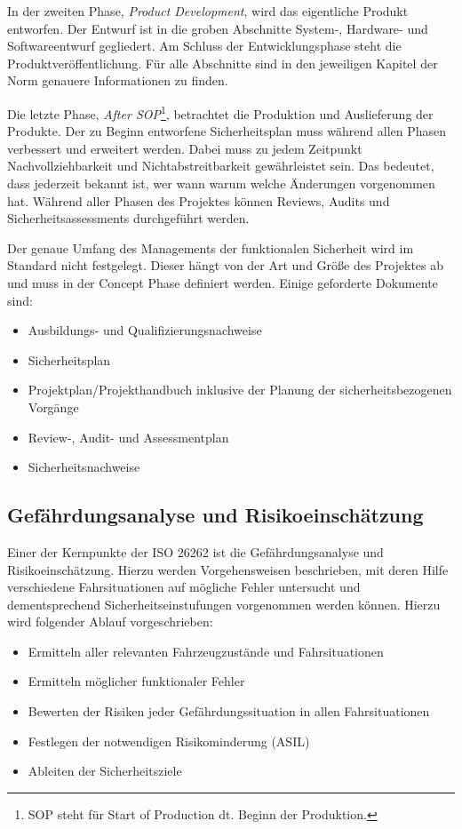 \documentclass[
  a4paper,					    %
  twoside,
  DIV=calc,     				%
  bibliography=totoc,
  cleardoublepage=empty,
  ngerman,     					%
  final       					%
]{scrbook}
\begin{document}
In der zweiten Phase, \emph{Product Development}, wird das eigentliche Produkt entworfen. Der Entwurf ist in die groben Abschnitte System-, Hardware- und Softwareentwurf gegliedert. Am Schluss der Entwicklungsphase steht die Produktveröffentlichung. Für alle Abschnitte sind in den jeweiligen Kapitel der Norm genauere Informationen zu finden.

Die letzte Phase, \emph{After SOP}\footnote{SOP steht für Start of Production dt. Beginn der Produktion.}, betrachtet die Produktion und Auslieferung der Produkte. Der zu Beginn entworfene Sicherheitsplan muss während allen Phasen verbessert und erweitert werden. Dabei muss zu jedem Zeitpunkt Nachvollziehbarkeit und Nichtabstreitbarkeit gewährleistet sein. Das bedeutet, dass jederzeit bekannt ist, wer wann warum welche Änderungen vorgenommen hat. Während aller Phasen des Projektes können Reviews, Audits und Sicherheitsassessments durchgeführt werden.

Der genaue Umfang des Managements der funktionalen Sicherheit wird im Standard nicht festgelegt. Dieser hängt von der Art und Größe des Projektes ab und muss in der Concept Phase definiert werden. Einige geforderte Dokumente sind:

\begin{itemize}
    \item Ausbildungs- und Qualifizierungsnachweise
    \item Sicherheitsplan
    \item Projektplan/Projekthandbuch inklusive der Planung der sicherheitsbezogenen Vorgänge
    \item Review-, Audit- und Assessmentplan
    \item Sicherheitsnachweise
\end{itemize}

\subsection{Gefährdungsanalyse und Risikoeinschätzung}
\label{sec:ISO26262_GundR}
Einer der Kernpunkte der ISO 26262 ist die Gefährdungsanalyse und Risikoeinschätzung. Hierzu werden Vorgehensweisen beschrieben, mit deren Hilfe verschiedene Fahrsituationen auf mögliche Fehler untersucht und dementsprechend Sicherheitseinstufungen vorgenommen werden können. Hierzu wird folgender Ablauf vorgeschrieben:

\begin{itemize}
    \item Ermitteln aller relevanten Fahrzeugzustände und Fahrsituationen
    \item Ermitteln möglicher funktionaler Fehler
    \item Bewerten der Risiken jeder Gefährdungssituation in allen Fahrsituationen
    \item Festlegen der notwendigen Risikominderung (ASIL)
    \item Ableiten der Sicherheitsziele
\end{itemize}
\end{document}
